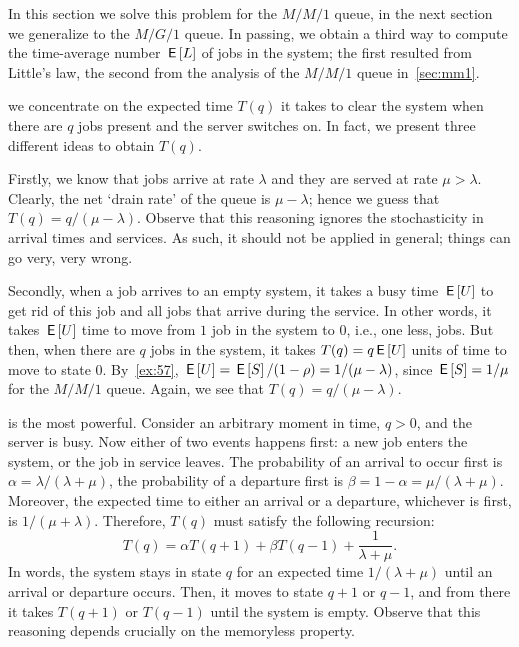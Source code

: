 In this section we solve this problem for the $M/M/1$ queue, in the next section we generalize to the $M/G/1$ queue.
In passing, we obtain a third way to compute the time-average number $\,\mathsf{E}\left[L\right]$ of jobs in the system; the first resulted from Little's law, the second from the analysis of the $M/M/1$ queue in~\cref{sec:mm1}. 


 we concentrate on the expected time $T(q)$ it takes to clear the system when there are $q$ jobs present and the server switches on.
In fact, we present three different ideas to obtain $T(q)$.

Firstly, we know that jobs arrive at rate $\lambda$ and they are served at rate $\mu>\lambda$.
Clearly, the net `drain rate' of the queue is $\mu-\lambda$; hence we guess that $T(q)=q/(\mu-\lambda)$.
Observe that this reasoning ignores the stochasticity in arrival times and services.
As such, it should not be applied in general; things can go very, very wrong.


Secondly, when a job arrives to an empty system, it takes a busy time $\,\mathsf{E}\left[U\right]$ to get rid of this job and all jobs that arrive during the service.
In other words, it takes $\,\mathsf{E}\left[U\right]$ time to move from $1$ job in the system to $0$, i.e., one less, jobs.
But then, when there are $q$ jobs in the system, it takes $T(q) = q\,\mathsf{E}\left[U\right]$ units of time to move to state $0$.
By~\cref{ex:57}, $\,\mathsf{E}\left[U\right]=\,\mathsf{E}\left[S\right]/(1-\rho)= 1/(\mu-\lambda)$, since $\,\mathsf{E}\left[S\right] = 1/\mu$ for the $M/M/1$ queue. Again, we see that $T(q)=q/(\mu-\lambda)$. 

 is the most powerful.
Consider an arbitrary moment in time, $q>0$, and the server is busy.
Now either of two events happens first: a new job enters the system, or the job in service leaves.
The probability of an arrival to occur first is $\alpha=\lambda/(\lambda+\mu)$, the probability of a departure first is $\beta=1-\alpha = \mu/(\lambda+\mu)$.
Moreover, the expected time to either an arrival or a departure, whichever is first, is $1/(\mu+\lambda)$. Therefore, $T(q)$ must satisfy the following recursion:
\begin{equation}  \label{eq:92}
  T(q) = \alpha T(q+1) + \beta T(q-1) + \frac{1}{\lambda+\mu}. 
\end{equation}
In words, the system stays in state $q$ for an expected time $1/(\lambda+\mu)$ until an arrival or departure occurs.
Then, it moves to state $q+1$ or $q-1$, and from there it takes $T(q+1)$ or $T(q-1)$ until the system is empty.
Observe that this reasoning depends crucially on the memoryless property.

